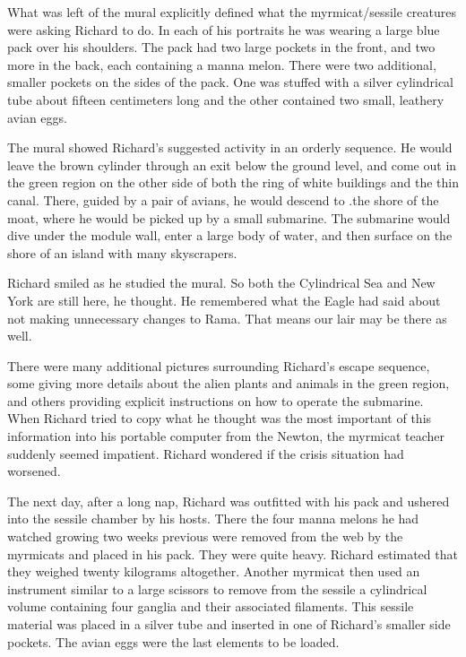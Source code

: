 \documentclass[]{article}
\begin{document}
{{What was left of the mural explicitly defined what the myrmicat/sessile creatures were asking Richard to do.  In each of his portraits he was wearing a large blue pack over his shoulders.  The pack had two large pockets in the front, and two more in the back, each containing a manna melon.  There were two additional, smaller pockets on the sides of the pack.  One was stuffed with a silver cylindrical tube about fifteen centimeters long and the other contained two small, leathery avian eggs.

The mural showed Richard’s suggested activity in an orderly sequence.  He would leave the brown cylinder through an exit below the ground level, and come out in the green region on the other side of both the ring of white buildings and the thin canal.  There, guided by a pair of avians, he would descend to .the shore of the moat, where he would be picked up by a small submarine.  The submarine would dive under the module wall, enter a large body of water, and then surface on the shore of an island with many skyscrapers.

Richard smiled as he studied the mural.  So both the Cylindrical Sea and New York are still here, he thought.  He remembered what the Eagle had said about not making unnecessary changes to Rama.  That means our lair may be there as well.

There were many additional pictures surrounding Richard’s escape sequence, some giving more details about the alien plants and animals in the green region, and others providing explicit instructions on how to operate the submarine.  When Richard tried to copy what he thought was the most important of this information into his portable computer from the Newton, the myrmicat teacher suddenly seemed impatient.  Richard wondered if the crisis situation had worsened.

The next day, after a long nap, Richard was outfitted with his pack and ushered into the sessile chamber by his hosts.  There the four manna melons he had watched growing two weeks previous were removed from the web by the myrmicats and placed in his pack.  They were quite heavy.  Richard estimated that they weighed twenty kilograms altogether.  Another myrmicat then used an instrument similar to a large scissors to remove from the sessile a cylindrical volume containing four ganglia and their associated filaments.  This sessile material was placed in a silver tube and inserted in one of Richard’s smaller side pockets.  The avian eggs were the last elements to be loaded.

}}
\end{document}
